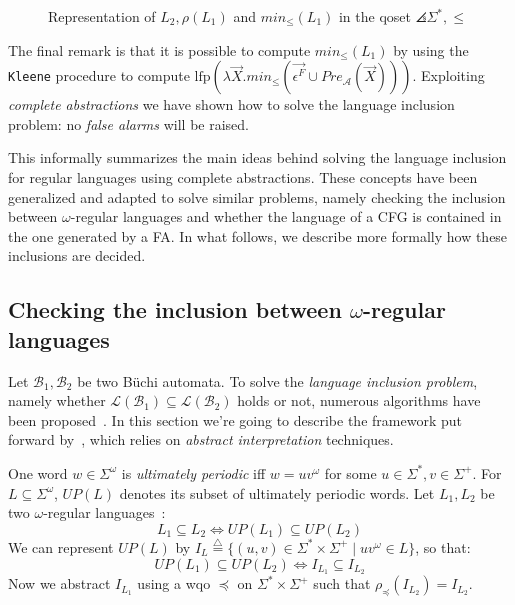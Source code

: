 \begin{figure}[h]
\centering
{}
\caption{Representation of $L_2,\rho(L_1)$ and $min_{\leq}(L_1)$ in the qoset $\angles{\Sigma^*, \leq}$}
\label{img:aa}
\end{figure}

The final remark is that it is possible to compute $min_{\leq}(L_1)$ by
using the \texttt{Kleene} procedure to compute
$\textrm{lfp}  (\lambda \vec{X} . min_{\leq}(\vec{\epsilon^F} \cup Pre_{\mathcal{A}}(\vec{X})))$.
Exploiting \emph{complete abstractions} we have shown how to
solve the language inclusion problem: no \emph{false alarms} will be raised.

This informally summarizes the main ideas behind solving the language inclusion
for regular languages using complete abstractions.
These concepts have been generalized and adapted to solve similar problems,
namely checking the inclusion between $\omega$-regular languages and
whether the language of a CFG is contained in the one generated by a FA.
In what follows, we describe more formally how these inclusions are decided.

\subsection{Checking the inclusion between $\omega$-regular languages}
\label{sec:checking-omega-lang-inc}

Let $\mathcal{B}_1, \mathcal{B}_2$ be two B{\"u}chi automata.
To solve the \emph{language inclusion problem},
namely whether $\mathcal{L}(\mathcal{B}_1) \subseteq \mathcal{L}(\mathcal{B}_2)$ holds or not,
numerous algorithms have been proposed~\cite{abdulla2011advanced,clemente2017efficient}.
In this section we're going to describe the framework
put forward by~\cite{ganty2020omegalang}, which relies on
\emph{abstract interpretation} techniques.

One word $w \in \Sigma^{\omega}$ is \emph{ultimately periodic} iff $w = uv ^{\omega}$
for some $u \in \Sigma^*, v \in \Sigma^+$.
For $L \subseteq \Sigma^{\omega}$, $UP(L)$ denotes its subset of ultimately periodic words.
Let $L_1,L_2$ be two $\omega$-regular languages~\cite{calbrix1993ultimately}:
\[L_1 \subseteq L_2 \Longleftrightarrow UP(L_1) \subseteq UP(L_2) \]
We can represent $UP(L)$ by
$I_L \overset{\triangle}{=} \{ (u,v) \in \Sigma^* \times \Sigma^+\;
| \; uv^{\omega} \in L\}$, so that:
\[UP(L_1) \subseteq UP(L_2) \Longleftrightarrow I_{L_1} \subseteq I_{L_2}\]
Now we abstract $I_{L_1}$ using a wqo $\preceq$ on $\Sigma^* \times \Sigma^+$
such that $\rho_{\preceq}(I_{L_2}) = I_{L_2}$.

